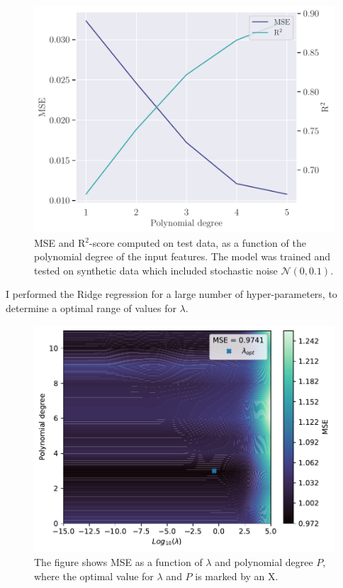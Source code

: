 \begin{figure}
    \centering
    \includegraphics[width=0.9\linewidth]{project-1/latex/figures/ols_error_scaled_N50.pdf}
    \caption{MSE and R$^{2}$-score computed on test data, as a function of the polynomial degree of the input features. The model was trained and tested on synthetic data which included stochastic noise $\mathcal{N}(0, 0.1)$.}
    \label{fig:ols_error}
\end{figure}

I performed the Ridge regression for a large number of hyper-parameters, to determine a optimal range of values for $\lambda$. 
\begin{figure}
    \centering
    \includegraphics[width=0.9\linewidth]{project-1/latex/figures/lmbda_opt.pdf}
    \caption{The figure shows MSE as a function of $\lambda$ and polynomial degree $P$, where the optimal value for $\lambda$ and $P$ is marked by an X.}
    \label{fig:lmbda_opt}
\end{figure}